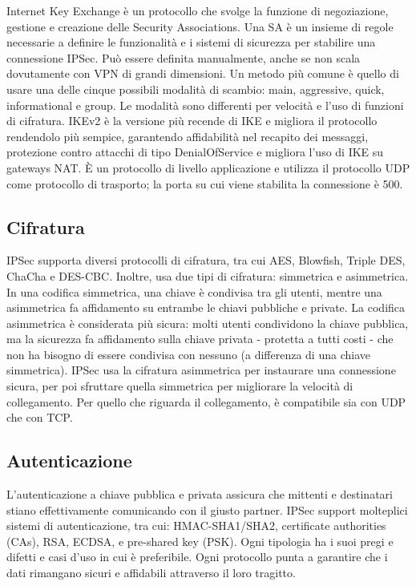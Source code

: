 Internet Key Exchange \cite[RFC4306]{RFC4306} è un protocollo che svolge la funzione di negoziazione, gestione e creazione delle Security Associations. Una SA è un insieme di regole necessarie a definire le funzionalità e i sistemi di sicurezza per stabilire una connessione IPSec. Può essere definita manualmente, anche se non scala dovutamente con VPN di grandi dimensioni. Un metodo più comune è quello di usare una delle cinque possibili modalità di scambio: main, aggressive, quick, informational e group.
Le modalità sono differenti per velocità e l'uso di funzioni di cifratura. IKEv2 è la versione più recende di IKE e migliora il protocollo rendendolo più sempice, garantendo affidabilità nel recapito dei messaggi, protezione contro attacchi di tipo DenialOfService e migliora l'uso di IKE su gateways NAT.
È un protocollo di livello applicazione e utilizza il protocollo UDP come protocollo di trasporto; la porta su cui viene stabilita la connessione è 500.

\subsection{Cifratura}
IPSec supporta diversi protocolli di cifratura, tra cui AES, Blowfish, Triple DES, ChaCha e DES-CBC. Inoltre, usa due tipi di cifratura: simmetrica e asimmetrica. In una codifica simmetrica, una chiave è condivisa tra gli utenti, mentre una asimmetrica fa affidamento su entrambe le chiavi pubbliche e private. La codifica asimmetrica è considerata più sicura: molti utenti condividono la chiave pubblica, ma la sicurezza fa affidamento sulla chiave privata - protetta a tutti costi - che non ha bisogno di essere condivisa con nessuno (a differenza di una chiave simmetrica).
IPSec usa la cifratura asimmetrica per instaurare una connessione sicura, per poi sfruttare quella simmetrica per migliorare la velocità di collegamento. Per quello che riguarda il collegamento, è compatibile sia con UDP che con TCP.


\subsection{Autenticazione}
L'autenticazione a chiave pubblica e privata assicura che mittenti e destinatari stiano effettivamente comunicando con il giusto partner. IPSec support molteplici sistemi di autenticazione, tra cui: HMAC-SHA1/SHA2, certificate authorities (CAs), RSA, ECDSA, e pre-shared key (PSK). Ogni tipologia ha i suoi pregi e difetti e casi d'uso in cui è preferibile. Ogni protocollo punta a garantire che i dati rimangano sicuri e affidabili attraverso il loro tragitto.

